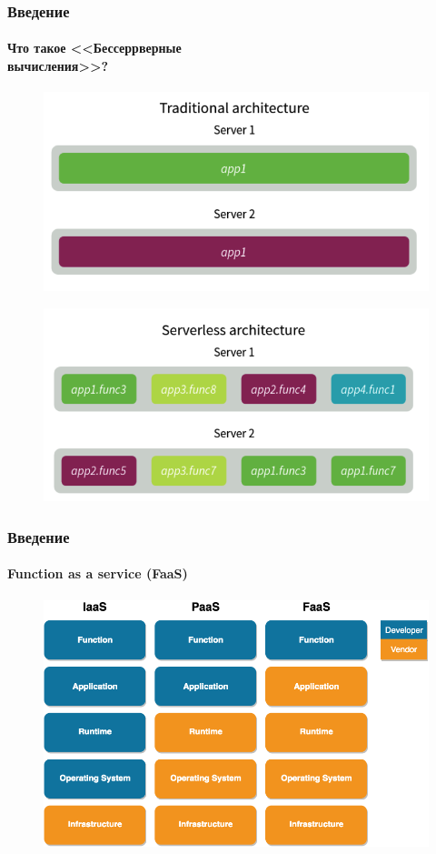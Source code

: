 \documentclass{beamer}
\begin{document}
    \begin{frame}
        \frametitle{Введение}
        \framesubtitle{Что такое <<Бессеррверные\\вычисления>>?}
        \begin{figure}
            \includegraphics[width=0.6\linewidth]{images/Traditional}
        \end{figure}
        \vspace*{-0.6cm}
        \begin{figure}
            \includegraphics[width=0.6\linewidth]{images/Serverless}
        \end{figure}
    \end{frame}


    \begin{frame}
        \frametitle{Введение}
        \framesubtitle{Function as a service (FaaS)}
        \vspace*{-0.3cm}
        \begin{figure}
            \includegraphics[width=0.9\linewidth]{images/Faas}
        \end{figure}
    \end{frame}
\end{document}
